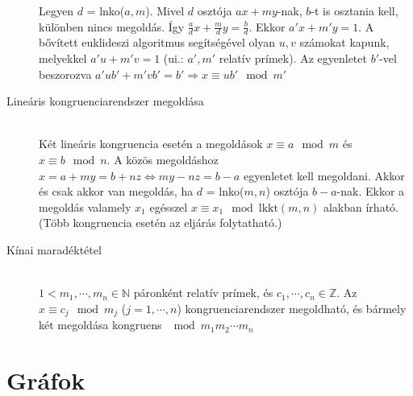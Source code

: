 \documentclass[margin=0px]{article}
\newcommand{\N}{\mathbb{N}}
\newcommand{\Z}{\mathbb{Z}}
\begin{document}
\begin{description}
						Legyen $d$ = lnko($a,m$). Mivel $d$ osztója $ax+my$-nak, $b$-t is osztania kell, különben nincs megoldás. Így $\frac{a}{d}x+\frac{m}{d}y = \frac{b}{d}$. Ekkor $a'x+m'y = 1$. A bővített euklideszi algoritmus segítségével olyan $u,v$ számokat kapunk, melyekkel $a'u+m'v = 1$ (ui.: $a', m'$ relatív prímek). Az egyenletet $b'$-vel beszorozva $a'ub'+m'vb' = b' \Rightarrow x \equiv ub' \mod{m'}$
					\item[Lineáris kongruenciarendszer megoldása] \hfill \\
						Két lineáris kongruencia esetén a megoldások $x \equiv a \mod{m}$ és $x \equiv b \mod{n}$. A közös megoldáshoz $x = a + my = b+ nz \Leftrightarrow my-nz = b-a$ egyenletet kell megoldani. Akkor és csak akkor van megoldás, ha $d$ = lnko($m,n$) osztója $b-a$-nak. Ekkor a megoldás valamely $x_1$ egésszel ${ x \equiv x_1 \mod{\textrm{lkkt}(m,n)}}$ alakban írható. (Több kongruencia esetén az eljárás folytatható.)
					\item[Kínai maradéktétel] \hfill \\
						 $1 < m_1,\cdots,m_n \in\N$ páronként relatív prímek, és $c_1,\cdots,c_n \in\Z$. Az $x \equiv c_j \mod{m_j}$ ($j=1,\cdots,n$) kongruenciarendszer megoldható, és bármely két megoldása kongruens  $\mod{m_1m_2\cdots m_n}$
				\end{description}
	\section{Gráfok}
\end{document}
